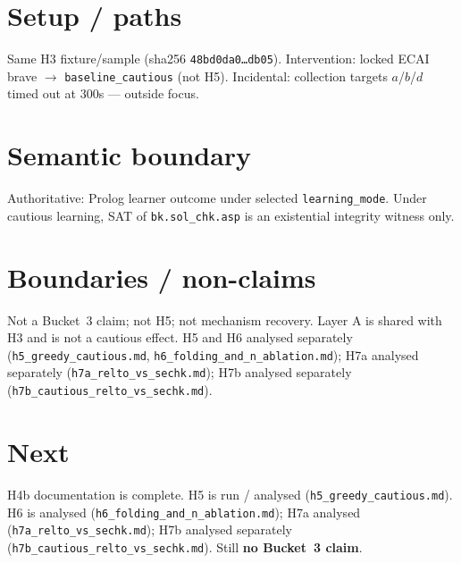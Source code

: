 \documentclass[11pt]{article}
\begin{document}
\section{Setup / paths}

Same H3 fixture/sample (sha256 \texttt{48bd0da0\ldots db05}).
Intervention: locked ECAI brave \(\to\) \texttt{baseline\_cautious}
(not H5).
Incidental: collection targets \(a\)/\(b\)/\(d\) timed out at 300s --- outside
focus.

\section{Semantic boundary}

Authoritative: Prolog learner outcome under selected \texttt{learning\_mode}.
Under cautious learning, SAT of \texttt{bk.sol\_chk.asp} is an existential
integrity witness only.

\section{Boundaries / non-claims}

Not a Bucket~3 claim; not H5; not mechanism recovery.
Layer A is shared with H3 and is not a cautious effect.
H5 and H6 analysed separately (\texttt{h5\_greedy\_cautious.md},
\texttt{h6\_folding\_and\_n\_ablation.md}); H7a analysed separately
(\texttt{h7a\_relto\_vs\_sechk.md}); H7b analysed separately
(\texttt{h7b\_cautious\_relto\_vs\_sechk.md}).

\section{Next}

H4b documentation is complete.
H5 is run / analysed (\texttt{h5\_greedy\_cautious.md}).
H6 is analysed (\texttt{h6\_folding\_and\_n\_ablation.md}); H7a analysed
(\texttt{h7a\_relto\_vs\_sechk.md}); H7b analysed separately
(\texttt{h7b\_cautious\_relto\_vs\_sechk.md}).
Still \textbf{no Bucket~3 claim}.
\end{document}
